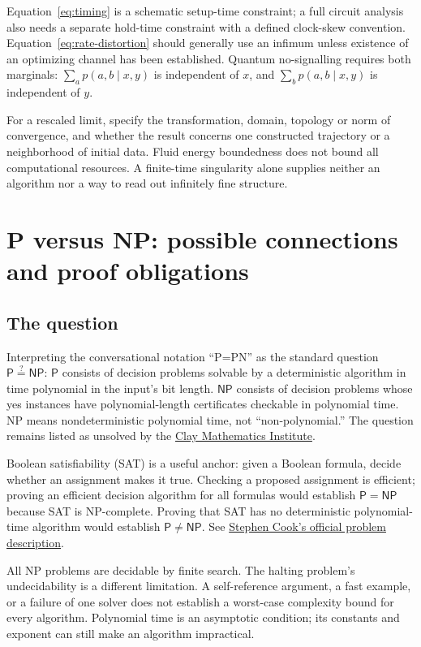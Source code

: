\documentclass[11pt]{article}
\theoremstyle{definition}
\theoremstyle{plain}
\theoremstyle{remark}
\begin{document}
Equation~\eqref{eq:timing} is a schematic setup-time constraint; a full circuit analysis also needs a separate hold-time constraint with a defined clock-skew convention. Equation~\eqref{eq:rate-distortion} should generally use an infimum unless existence of an optimizing channel has been established. Quantum no-signalling requires both marginals: $\sum_a p(a,b\mid x,y)$ is independent of $x$, and $\sum_b p(a,b\mid x,y)$ is independent of $y$.

For a rescaled limit, specify the transformation, domain, topology or norm of convergence, and whether the result concerns one constructed trajectory or a neighborhood of initial data. Fluid energy boundedness does not bound all computational resources. A finite-time singularity alone supplies neither an algorithm nor a way to read out infinitely fine structure.

\section{P versus NP: possible connections and proof obligations}\label{app:pnp}

\subsection{The question}

Interpreting the conversational notation ``P=PN'' as the standard question $\mathsf P\stackrel{?}{=}\mathsf{NP}$: $\mathsf P$ consists of decision problems solvable by a deterministic algorithm in time polynomial in the input's bit length. $\mathsf{NP}$ consists of decision problems whose yes instances have polynomial-length certificates checkable in polynomial time. NP means nondeterministic polynomial time, not ``non-polynomial.'' The question remains listed as unsolved by the \href{https://www.claymath.org/millennium/p-vs-np/}{Clay Mathematics Institute}.

Boolean satisfiability (SAT) is a useful anchor: given a Boolean formula, decide whether an assignment makes it true. Checking a proposed assignment is efficient; proving an efficient decision algorithm for all formulas would establish $\mathsf P=\mathsf{NP}$ because SAT is NP-complete. Proving that SAT has no deterministic polynomial-time algorithm would establish $\mathsf P\ne\mathsf{NP}$. See \href{https://www.claymath.org/wp-content/uploads/2022/06/pvsnp.pdf}{Stephen Cook's official problem description}.

All NP problems are decidable by finite search. The halting problem's undecidability is a different limitation. A self-reference argument, a fast example, or a failure of one solver does not establish a worst-case complexity bound for every algorithm. Polynomial time is an asymptotic condition; its constants and exponent can still make an algorithm impractical.
\end{document}

